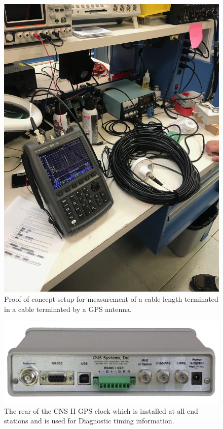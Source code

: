 \documentclass{article}
\begin{document}
\begin{figure}[!htb]
	\begin{center}
		\includegraphics[width=0.8\linewidth]{img/time-domain-reflectrometer-dtf-test.jpg}
	\end{center}
	\caption{Proof of concept setup for measurement of a cable length terminated in a cable terminated by a GPS antenna.}
	\label{fig:tdr-test}
\end{figure}
\begin{figure}
	\begin{center}
		\includegraphics[width=0.8\linewidth]{img/cns-ii-rear.png}
	\end{center}
	\caption{The rear of the CNS II GPS clock which is installed at all end stations and is used for Diagnostic timing information.}
	\label{fig:cns-ii-rear}
\end{figure}
\end{document}
